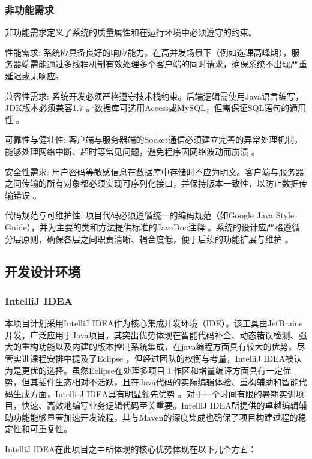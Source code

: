 \documentclass[a4paper]{ctexart}
\begin{document}
\subsubsection{非功能需求}

非功能需求定义了系统的质量属性和在运行环境中必须遵守的约束。

性能需求: 系统应具备良好的响应能力。在高并发场景下（例如选课高峰期），服务器端需能通过多线程机制有效处理多个客户端的同时请求，确保系统不出现严重延迟或无响应。

兼容性需求: 系统开发必须严格遵守技术栈约束。后端逻辑需使用Java语言编写，JDK版本必须兼容1.7 。数据库可选用Access或MySQL，但需保证SQL语句的通用性 。

可靠性与健壮性: 客户端与服务器端的Socket通信必须建立完善的异常处理机制，能够处理网络中断、超时等常见问题，避免程序因网络波动而崩溃 。

安全性需求: 用户密码等敏感信息在数据库中存储时不应为明文。客户端与服务器之间传输的所有对象都必须实现可序列化接口，并保持版本一致性，以防止数据传输错误 。

代码规范与可维护性: 项目代码必须遵循统一的编码规范（如Google Java Style Guide），并为主要的类和方法提供标准的JavaDoc注释 。系统的设计应严格遵循分层原则，确保各层之间职责清晰、耦合度低，便于后续的功能扩展与维护 。

\subsection{开发设计环境}

\subsubsection{IntelliJ IDEA}

本项目计划采用IntelliJ IDEA作为核心集成开发环境（IDE）。该工具由JetBrains开发，广泛应用于Java项目，其突出优势体现在智能代码补全、动态错误检测、强大的重构功能以及内建的版本控制系统集成，在java编程方面具有较大的优势。尽管实训课程安排中提及了Eclipse ，但经过团队的权衡与考量，IntelliJ IDEA被认为是更优的选择。虽然Eclipse在处理多项目工作区和增量编译方面具有一定优势，但其插件生态相对不活跃，且在Java代码的实际编辑体验、重构辅助和智能代码生成方面，Intelli-J IDEA具有明显领先优势 。对于一个时间有限的暑期实训项目，快速、高效地编写业务逻辑代码至关重要。IntelliJ IDEA所提供的卓越编辑辅助功能能够显著加速开发流程，其与Maven的深度集成也确保了项目构建过程的稳定性和可重复性。

IntelliJ IDEA在此项目之中所体现的核心优势体现在以下几个方面：
\end{document}
